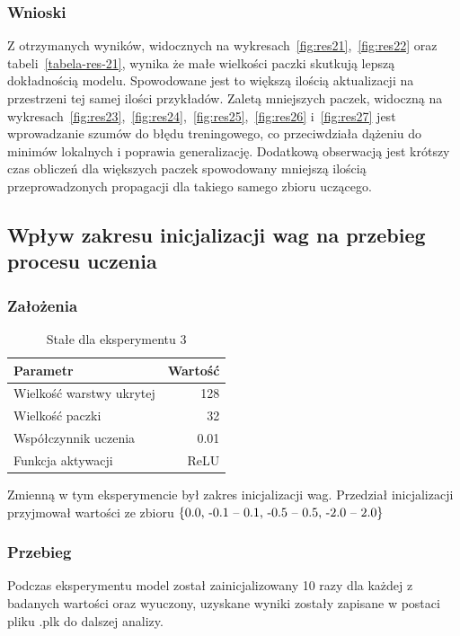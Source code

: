 \documentclass{article}
\begin{document}
\subsubsection*{Wnioski}

Z otrzymanych wyników, widocznych na wykresach~\ref{fig:res21},~\ref{fig:res22} oraz tabeli~\ref{tabela-res-21}, wynika że małe wielkości paczki skutkują lepszą dokładnością modelu. Spowodowane jest to większą ilością aktualizacji na przestrzeni tej samej ilości przykładów. Zaletą mniejszych paczek, widoczną na wykresach~\ref{fig:res23},~\ref{fig:res24},~\ref{fig:res25},~\ref{fig:res26} i~\ref{fig:res27} jest wprowadzanie szumów do błędu treningowego, co przeciwdziała dążeniu do minimów lokalnych i poprawia generalizację. Dodatkową obserwacją jest krótszy czas obliczeń dla większych paczek spowodowany mniejszą ilością przeprowadzonych propagacji dla takiego samego zbioru uczącego.

\newpage
\subsection{Wpływ zakresu inicjalizacji wag na przebieg procesu uczenia}
\subsubsection*{Założenia}
\begin{table}[H]
	\caption{Stałe dla eksperymentu 3}
	\label{tabela-const-3}
	\centering
	\begin{tabular}{lr}
		\toprule
		Parametr                   & Wartość \\
		\midrule
		Wielkość warstwy ukrytej & 128       \\
		Wielkość paczki          & 32        \\
		Współczynnik uczenia     & 0.01      \\
		Funkcja aktywacji          & ReLU      \\
		\bottomrule
	\end{tabular}
\end{table}

Zmienną w tym eksperymencie był zakres inicjalizacji wag. Przedział inicjalizacji przyjmował wartości ze zbioru \(\{$0.0, -0.1 -- 0.1, -0.5 -- 0.5, -2.0 -- 2.0$\}\)
\subsubsection*{Przebieg}

Podczas eksperymentu model został zainicjalizowany 10 razy dla każdej z badanych wartości oraz wyuczony, uzyskane wyniki zostały zapisane w postaci pliku .plk do dalszej analizy.
\end{document}
